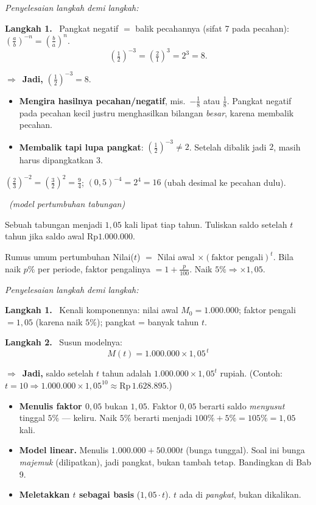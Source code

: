 \documentclass[11pt,a4paper]{report}
\theoremstyle{gaya}
\newcommand{\jawab}{\par\smallskip\noindent\textit{\textcolor{oranye}{Penyelesaian langkah demi langkah:}}\par\smallskip}
\newcommand{\langkah}[1]{\par\smallskip\noindent\textbf{\textcolor{biru}{Langkah #1.}}\ }
\newcommand{\jadi}{\par\smallskip\noindent$\Rightarrow$\ \textbf{Jadi, }}
\newcommand{\soalno}[2]{%
  \par\bigskip
  \noindent{\large\bfseries\color{ungu}\rule[-2pt]{4pt}{14pt}\ Soal #1}%
  \ {\normalfont\itshape\color{gray}(#2)}\par\nopagebreak\smallskip}
\begin{document}
\jawab
\langkah{1} Pangkat negatif $=$ balik pecahannya (sifat 7 pada pecahan):
$\left(\frac ab\right)^{-n}=\left(\frac ba\right)^{n}$.
\[
\left(\tfrac12\right)^{-3} = \left(\tfrac21\right)^{3} = 2^3 = 8.
\]
\jadi $\left(\tfrac12\right)^{-3} = 8$.

\begin{jebakan}
\begin{itemize}[leftmargin=*,topsep=2pt]
  \item \textbf{Mengira hasilnya pecahan/negatif}, mis.\ $-\frac18$ atau
  $\frac18$. Pangkat negatif pada pecahan kecil justru menghasilkan bilangan
  \emph{besar}, karena membalik pecahan.
  \item \textbf{Membalik tapi lupa pangkat}: $\left(\frac12\right)^{-3}\neq 2$.
  Setelah dibalik jadi $2$, masih harus dipangkatkan $3$.
\end{itemize}
\end{jebakan}

\begin{variasi}
$\left(\tfrac23\right)^{-2}=\left(\tfrac32\right)^2=\tfrac94$;
$\left(0{,}5\right)^{-4}=2^4=16$ (ubah desimal ke pecahan dulu).
\end{variasi}

\soalno{1.1.10}{model pertumbuhan tabungan}
\begin{soalbox}{}
Sebuah tabungan menjadi $1{,}05$ kali lipat tiap tahun. Tuliskan saldo setelah
$t$ tahun jika saldo awal Rp$1.000.000$.
\end{soalbox}

\begin{ingat}{Rumus umum pertumbuhan}
Nilai($t$) $=$ Nilai awal $\times (\text{faktor pengali})^{t}$. Bila naik $p\%$
per periode, faktor pengalinya $=1+\frac{p}{100}$. Naik $5\%\Rightarrow \times1{,}05$.
\end{ingat}

\jawab
\langkah{1} Kenali komponennya: nilai awal $M_0 = 1.000.000$; faktor pengali
$=1{,}05$ (karena naik $5\%$); pangkat = banyak tahun $t$.
\langkah{2} Susun modelnya:
\[
\boxed{\,M(t) = 1.000.000 \times 1{,}05^{\,t}\,}
\]
\jadi saldo setelah $t$ tahun adalah $1.000.000\times 1{,}05^{t}$ rupiah.
(Contoh: $t=10\Rightarrow 1.000.000\times1{,}05^{10}\approx \text{Rp}\,1.628.895$.)

\begin{jebakan}
\begin{itemize}[leftmargin=*,topsep=2pt]
  \item \textbf{Menulis faktor $0{,}05$} bukan $1{,}05$. Faktor $0{,}05$ berarti
  saldo \emph{menyusut} tinggal $5\%$ --- keliru. Naik $5\%$ berarti menjadi
  $100\%+5\%=105\%=1{,}05$ kali.
  \item \textbf{Model linear.} Menulis $1.000.000 + 50.000t$ (bunga tunggal).
  Soal ini bunga \emph{majemuk} (dilipatkan), jadi pangkat, bukan tambah tetap.
  Bandingkan di Bab 9.
  \item \textbf{Meletakkan $t$ sebagai basis} ($1{,}05\cdot t$). $t$ ada di
  \emph{pangkat}, bukan dikalikan.
\end{itemize}
\end{jebakan}
\end{document}
